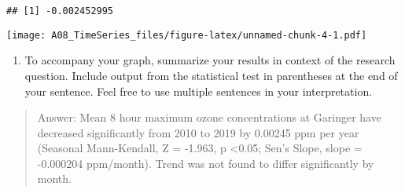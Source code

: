 \documentclass[
]{article}
\newenvironment{Shaded}{\begin{snugshade}}{\end{snugshade}}
\newcommand{\CommentTok}[1]{\textcolor[rgb]{0.56,0.35,0.01}{\textit{#1}}}
\newcommand{\DataTypeTok}[1]{\textcolor[rgb]{0.13,0.29,0.53}{#1}}
\newcommand{\FloatTok}[1]{\textcolor[rgb]{0.00,0.00,0.81}{#1}}
\newcommand{\KeywordTok}[1]{\textcolor[rgb]{0.13,0.29,0.53}{\textbf{#1}}}
\newcommand{\NormalTok}[1]{#1}
\newcommand{\OperatorTok}[1]{\textcolor[rgb]{0.81,0.36,0.00}{\textbf{#1}}}
\newcommand{\StringTok}[1]{\textcolor[rgb]{0.31,0.60,0.02}{#1}}
\providecommand{\tightlist}{%
  \setlength{\itemsep}{0pt}\setlength{\parskip}{0pt}}
\begin{document}
\begin{verbatim}
## [1] -0.002452995
\end{verbatim}

\begin{Shaded}
\end{Shaded}

\texttt{[image: A08\_TimeSeries\_files/figure-latex/unnamed-chunk-4-1.pdf]}

\begin{enumerate}
\def\labelenumi{\arabic{enumi}.}
\setcounter{enumi}{13}
\tightlist
\item
  To accompany your graph, summarize your results in context of the
  research question. Include output from the statistical test in
  parentheses at the end of your sentence. Feel free to use multiple
  sentences in your interpretation.
\end{enumerate}

\begin{quote}
Answer: Mean 8 hour maximum ozone concentrations at Garinger have
decreased significantly from 2010 to 2019 by 0.00245 ppm per year
(Seasonal Mann-Kendall, Z = -1.963, p \textless0.05; Sen's Slope, slope
= -0.000204 ppm/month). Trend was not found to differ significantly by
month.
\end{quote}
\end{document}
